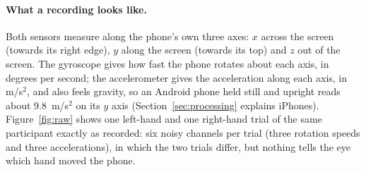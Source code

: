 \paragraph{What a recording looks like.} Both sensors measure along the phone's own three axes: $x$ across the screen
(towards its right edge), $y$ along the screen (towards its top) and $z$ out of the screen. The gyroscope gives how
fast the phone rotates about each axis, in degrees per second; the accelerometer gives the acceleration along each
axis, in m/s$^2$, and also feels gravity, so an Android phone held still and upright reads about 9.8~m/s$^2$ on its
$y$ axis (Section~\ref{sec:processing} explains iPhones). Figure~\ref{fig:raw} shows one left-hand and one right-hand
trial of the same participant exactly as recorded: six noisy channels per trial (three rotation speeds and three
accelerations), in which the two trials differ, but nothing tells the eye which hand moved the phone.
